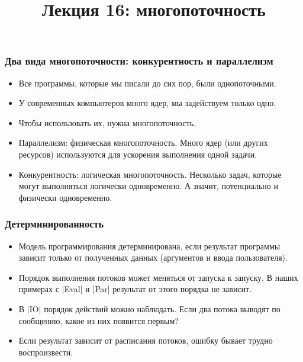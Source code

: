 \documentclass[11pt]{beamer}
\title{Лекция 16: многопоточность}
\begin{document}
\begin{frame}[plain]
  \maketitle
\end{frame}

\begin{frame}[fragile]
  \frametitle{Два вида многопоточности: конкурентность и параллелизм}
  \begin{itemize}
    \item Все программы, которые мы писали до сих пор, были однопоточными.
    \item У современных компьютеров много ядер, мы задействуем только одно.
    \item Чтобы использовать их, нужна многопоточность. \pause
    \item Параллелизм: физическая многопоточность. Много ядер (или других ресурсов) используются для ускорения выполнения одной задачи. \pause
    \item Конкурентность: логическая многопоточность. Несколько задач, которые могут выполняться логически одновременно. А значит, потенциально и физически одновременно.
  \end{itemize}
\end{frame}

\begin{frame}[fragile]
  \frametitle{Детерминированность}
  \begin{itemize}
    \item Модель программирования детерминирована, если результат программы зависит только от полученных данных (аргументов и ввода пользователя). \pause
    \item Порядок выполнения потоков может меняться от запуска к запуску. В наших примерах с \haskinline|Eval| и \haskinline|Par| результат от этого порядка не зависит. \pause
    \item В \haskinline|IO| порядок действий можно наблюдать. Если два потока выводят по сообщению, какое из них появится первым?
    \item Если результат зависит от расписания потоков, ошибку бывает трудно воспроизвести.
  \end{itemize}
\end{frame}
\end{document}
